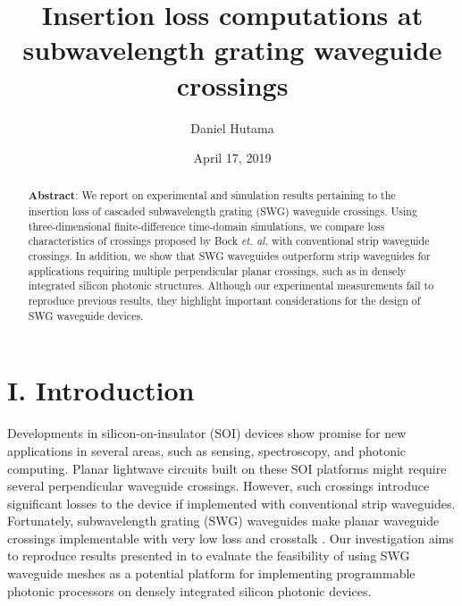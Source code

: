 \documentclass[aps,prl,twocolumn, superscriptaddress]{revtex4}
\begin{document}
\title{Insertion loss computations at subwavelength grating waveguide crossings}


\author{Daniel Hutama}



\date{April 17, 2019}
\begin{abstract}
\noindent \textbf{Abstract}: We report on experimental and simulation results pertaining to the insertion loss of cascaded subwavelength grating (SWG) waveguide crossings. Using three-dimensional finite-difference time-domain simulations, we compare loss characteristics of crossings proposed by Bock \textit{et. al.} with conventional strip waveguide crossings.  In addition, we show that SWG waveguides outperform strip waveguides for applications requiring multiple perpendicular planar crossings, such as in densely integrated silicon photonic structures. Although our experimental measurements fail to reproduce previous results, they highlight important considerations for the design of SWG waveguide devices.
\end{abstract}
\pacs{}
\maketitle

\section{I. Introduction}
\vspace{-1em}
Developments in silicon-on-insulator (SOI) devices show promise for new applications in several areas, such as sensing, spectroscopy, and photonic computing. Planar lightwave circuits built on these SOI platforms might require several perpendicular waveguide crossings. However, such crossings introduce significant losses to the device if implemented with conventional strip waveguides. Fortunately, subwavelength grating (SWG) waveguides make planar waveguide crossings implementable with very low loss and crosstalk \cite{BockPaper}. Our investigation aims to reproduce results presented in \cite{BockPaper} to evaluate the feasibility of using SWG waveguide meshes as a potential platform for implementing programmable photonic processors on densely integrated silicon photonic devices. 
\end{document}
